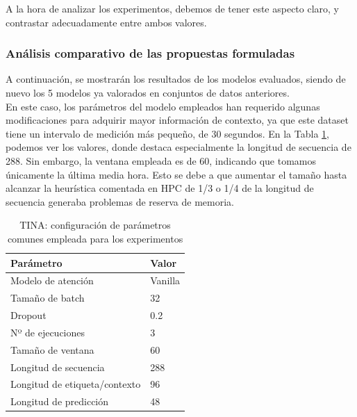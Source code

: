 A la hora de analizar los experimentos, debemos de tener este aspecto claro, y contrastar adecuadamente entre ambos valores.

\subsubsection{Análisis comparativo de las propuestas formuladas}

A continuación, se mostrarán los resultados de los modelos evaluados, siendo de nuevo los 5 modelos ya valorados en conjuntos de datos anteriores.\\

En este caso, los parámetros del modelo empleados han requerido algunas modificaciones para adquirir mayor información de contexto, ya que este dataset tiene un intervalo de medición más pequeño, de 30 segundos. En la Tabla \ref{ajustestina}, podemos ver los valores, donde destaca especialmente la longitud de secuencia de 288. Sin embargo, la ventana empleada es de 60, indicando que tomamos únicamente la última media hora. Esto se debe a que aumentar el tamaño hasta alcanzar la heurística comentada en HPC de 1/3 o 1/4 de la longitud de secuencia generaba problemas de reserva de memoria.

\begin{table}[!ht]
	\centering
	\begin{tabular}{l|l}
		\toprule
		Parámetro & Valor \\
		\midrule
		{Modelo de atención} & Vanilla \\
		{Tamaño de batch} & 32 \\
		{Dropout} & 0.2 \\
		{Nº de ejecuciones} & 3 \\
		{Tamaño de ventana} & 60 \\
		{Longitud de secuencia} & 288 \\
		{Longitud de etiqueta/contexto} & 96 \\
		{Longitud de predicción} & 48 \\
		\bottomrule
	\end{tabular}
	\caption{TINA: configuración de parámetros comunes empleada para los experimentos}
	\label{ajustestina}
\end{table}

